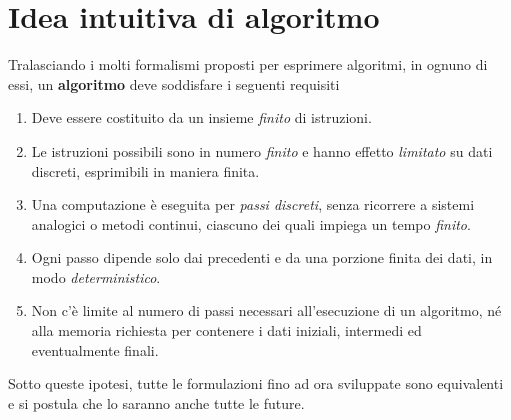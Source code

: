 \section{Idea intuitiva di algoritmo} \label{sec: algoritmo}
Tralasciando i molti formalismi proposti per esprimere algoritmi,
in ognuno di essi, un \textbf{algoritmo} deve soddisfare i
seguenti requisiti
\begin{enumerate}
	\item Deve essere costituito da un insieme \emph{finito} di
	      istruzioni.
	\item Le istruzioni possibili sono in numero \emph{finito}
	      e hanno effetto \emph{limitato} su dati discreti,
	      esprimibili in maniera finita.
	\item Una computazione è eseguita per \emph{passi discreti},
	      senza ricorrere a sistemi analogici o metodi continui,
	      ciascuno dei quali impiega un tempo \emph{finito}.
	\item Ogni passo dipende solo dai precedenti e da una
	      porzione finita dei dati, in modo
	      \emph{deterministico}.
	\item Non c'è limite al numero di passi necessari
	      all'esecuzione di un algoritmo, né alla memoria
	      richiesta per contenere i dati iniziali, intermedi ed
	      eventualmente finali.
\end{enumerate}
Sotto queste ipotesi, tutte le formulazioni fino ad ora
sviluppate sono equivalenti e si postula che lo saranno anche
tutte le future.

